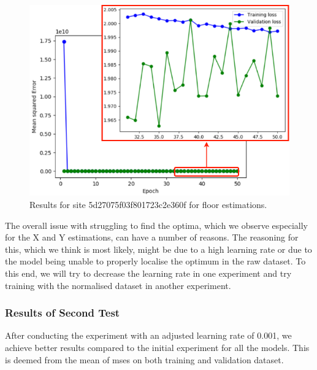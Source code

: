 \begin{figure}[H]
    \centering
    \includegraphics[scale=0.4]{Images/Experiments/NN/1.initial/5d27075f03f801723c2e360f_floor.png}
    \caption{Results for site 5d27075f03f801723c2e360f for floor estimations.}
    \label{fig:NN01_floor}
\end{figure}

The overall issue with struggling to find the optima, which we observe especially for the X and Y estimations, can have a number of reasons. The reasoning for this, which we think is most likely, might be due to a high learning rate or due to the model being unable to properly localise the optimum in the raw dataset. To this end, we will try to decrease the learning rate in one experiment and try training with the normalised dataset in another experiment.


\subsubsection{Results of Second Test}
After conducting the experiment with an adjusted learning rate of 0.001, we achieve better results compared to the initial experiment for all the models. This is deemed from the mean of \gls{mse}s on both training and validation dataset. 


